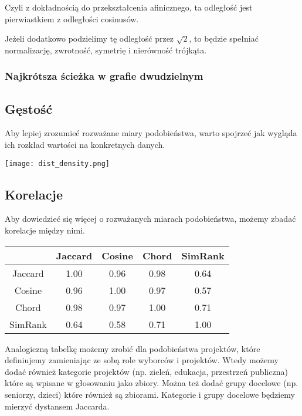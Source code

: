 \documentclass{article}
\begin{document}
Czyli z dokładnością do przekształcenia afinicznego, ta odległość jest
pierwiastkiem z odległości cosinusów.

Jeżeli dodatkowo podzielimy tę odległość przez $\sqrt 2$, to będzie spełniać
normalizację, zwrotność, symetrię i nierówność trójkąta.

\subsubsection{Najkrótsza ścieżka w grafie dwudzielnym}

\subsection{Gęstość}

Aby lepiej zrozumieć rozważane miary podobieństwa, warto spojrzeć jak wygląda
ich rozkład wartości na konkretnych danych.

\noindent
\texttt{[image: dist\_density.png]}

\subsection{Korelacje}

Aby dowiedzieć się więcej o rozważanych miarach podobieństwa, możemy zbadać
korelacje między nimi.

\begin{center}
\begin{tabular}{|c|cccc|}
  \hline
    & Jaccard & Cosine & Chord & SimRank \\
  \hline
  Jaccard & 1.00 & 0.96 & 0.98 & 0.64 \\
  Cosine  & 0.96 & 1.00 & 0.97 & 0.57 \\
  Chord   & 0.98 & 0.97 & 1.00 & 0.71 \\
  SimRank & 0.64 & 0.58 & 0.71 & 1.00 \\
  \hline
\end{tabular}
\end{center}

Analogiczną tabelkę możemy zrobić dla podobieństwa projektów, które definiujemy
zamieniając ze sobą role wyborców i projektów. Wtedy możemy dodać również
kategorie projektów (np. zieleń, edukacja, przestrzeń publiczna) które są
wpisane w głosowaniu jako zbiory. Można też dodać grupy docelowe (np. seniorzy,
dzieci) które również są zbiorami. Kategorie i grupy docelowe będziemy mierzyć
dystansem Jaccarda.
\end{document}
